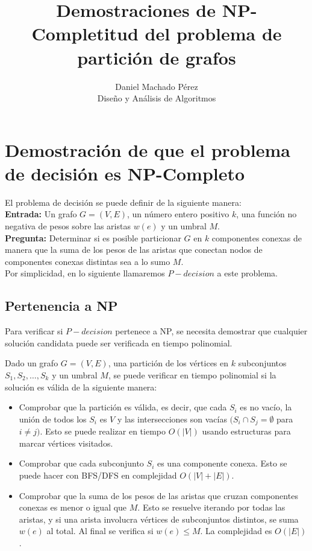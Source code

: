 \documentclass[a4paper,12pt]{article}
\title{\textbf{Demostraciones de NP-Completitud del problema de partición de grafos}}
\author{Daniel Machado Pérez \\
Diseño y Análisis de Algoritmos}
\date{}
\begin{document}
\maketitle
\tableofcontents
\newpage




\section{Demostración de que el problema de decisión es NP-Completo}

El problema de decisión se puede definir de la 
siguiente manera: \\

\textbf{Entrada:} Un grafo \( G = (V, E) \), un número entero positivo \( k \), 
una función no negativa de pesos sobre las aristas $w(e)$ 
y un umbral \( M \).\\

\textbf{Pregunta:} Determinar si es posible 
particionar \( G \) en \( k \) componentes conexas de 
manera que la suma de los pesos de las aristas que conectan nodos de 
componentes conexas distintas sea a lo sumo \( M \).\\

Por simplicidad, en lo siguiente llamaremos $P-decision$ a este problema. 

\subsection{Pertenencia a NP}

Para verificar si $P-decision$ pertenece a NP, 
se necesita demostrar que cualquier solución candidata 
puede ser verificada en tiempo polinomial.

Dado un grafo \( G = (V, E) \), una partición de los 
vértices en \( k \) subconjuntos $S_1, S_2, \ldots, S_k$ y un 
umbral \( M \), se puede verificar en tiempo 
polinomial si la solución es válida de la siguiente 
manera:

\begin{itemize}
    \item Comprobar que la partición es válida, es decir, que cada $S_i$ es no vacío, la unión de todos los $S_i$ es $V$ y las intersecciones son vacías $(S_i \cap  S_j = \emptyset$ para $ i \neq j)$. Esto se puede realizar en tiempo \( O(|V|) \) usando estructuras para marcar vértices visitados.
    \item Comprobar que cada subconjunto $S_i$ es una componente conexa. Esto se puede hacer con BFS/DFS en complejidad $O(|V|+|E|)$.
    \item Comprobar que la suma de los pesos de las aristas que cruzan componentes conexas es menor o igual que $M$. Esto se resuelve iterando por todas las aristas, y si una arista involucra vértices de subconjuntos distintos, se suma $w(e)$ al total. Al final se verifica si $w(e) \leq M$. La complejidad es $O(|E|)$.
\end{itemize}
\end{document}
